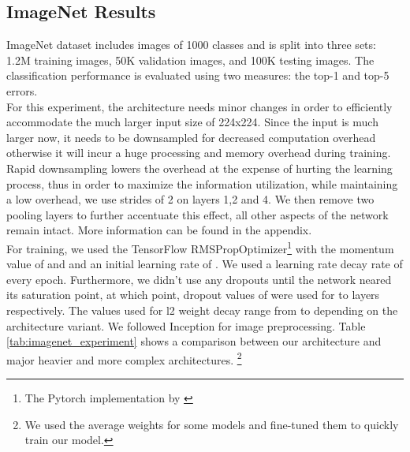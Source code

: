 \documentclass{article} \usepackage{lets_keepit_simple,times}
\begin{document}
\subsection{ImageNet Results}
ImageNet\cite{Russakovsky_ImageNet_2015} dataset includes images of 1000 classes and is split into three sets: 1.2M training images, 50K validation images, and 100K testing images. The classification performance is evaluated using two measures: the top-1 and top-5 errors.\\
For this experiment, the architecture needs minor changes in order to efficiently accommodate the much larger input size of 224x224. Since the input is much larger now, it needs to be downsampled for decreased computation overhead otherwise it will incur a huge processing and memory overhead during training. 
Rapid downsampling lowers the overhead at the expense of hurting the learning process, thus in order to maximize the information utilization, while maintaining a low overhead, we use strides of 2 on layers 1,2 and 4. We then remove two pooling layers to further accentuate this effect, all other aspects of the network remain intact. More information can be found in the appendix.\\ 
For training, we used the TensorFlow RMSPropOptimizer\footnote{The Pytorch implementation by \cite{rw2019timm}} with the momentum value of  and  and an initial learning rate of . We used a learning rate decay rate of  every epoch. Furthermore, we didn't use any dropouts until the network neared its saturation point, at which point, dropout values of  were used for  to  layers respectively. The values used for l2 weight decay range from  to  depending on the architecture variant.  
We followed Inception \cite{Szegedy_inceptiov4_2016} for image preprocessing. Table \ref{tab:imagenet_experiment} shows a comparison between our architecture and major heavier and more complex architectures. \footnote{We used the average weights for some models and fine-tuned them to quickly train our model.}
\end{document}
